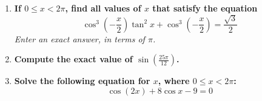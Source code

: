 \documentclass[12pt]{article}
\begin{document}
\begin{enumerate}
    \item \textbf{If \( 0 \leq x < 2\pi \), find all values of \( x \) that satisfy the equation}
    \[ \cos^3\left(-\frac{x}{2}\right)\tan^2 x + \cos^3\left(-\frac{x}{2}\right) = \frac{\sqrt{3}}{2} \]
    \textit{Enter an exact answer, in terms of \( \pi \).}
    \vspace{45mm}

    \item \textbf{Compute the exact value of \( \sin\left(\frac{25\pi}{12}\right) \).}
    \vspace{45mm}

    \item \textbf{Solve the following equation for \( x \), where \( 0 \leq x < 2\pi \):}
    \[ \cos(2x) + 8\cos x - 9 = 0 \]
    \vspace{45mm}
\end{enumerate}
\end{document}
